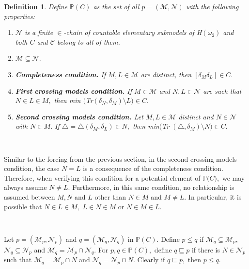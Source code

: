 \documentclass{article}
\newtheorem{definition}[theorem]{Definition}
\begin{document}
\begin{definition}
Define $\mathbb{P}\left(  C\right)  $ as the set of all $p=(\mathcal{M}%
,\mathcal{N})$ with the following properties:

\begin{enumerate}
\item $\mathcal{N}$ is a finite $\in$-chain of countable elementary submodels
of \textsf{H}$\left(  \omega_{2}\right)  $ and both $C$ and $\mathcal{C}$
belong to all of them.

\item $\mathcal{M\subseteq N}.$

\item \textbf{Completeness condition. }If $M,L\in\mathcal{M}$ are distinct,
then $\left[  \delta_{M}\delta_{L}\right]  \in C.$

\item \textbf{First} \textbf{crossing models condition. }If $M\in\mathcal{M}$
and $N,L\in\mathcal{N}$ are such that $N\in L\in M,$ then \textsf{min}%
$($\textsf{Tr}$(\delta_{N},\delta_{M})\setminus L)\in C.$

\item \textbf{Second crossing models condition. }Let $M,L\in\mathcal{M}$
distinct and $N\in\mathcal{N}$ with $N\in M.$ If $\triangle=\triangle\left(
\delta_{M},\delta_{L}\right)  \in N,$ then \textsf{min}$($\textsf{Tr}%
$(\triangle,\delta_{M})\setminus N)\in C.$
\end{enumerate}
\end{definition}

\qquad\ \qquad\ \qquad\ \ 

Similar to the forcing from the previous section, in the second crossing
models condition, the case $N=L$ is a consequence of the completeness
condition. Therefore, when verifying this condition for a potential element of
$\mathbb{P(}C\mathbb{)},$ we may always assume $N\neq L.$ Furthermore, in this
same condition, no relationship is assumed between $M,N$ and $L$ other than
$N\in M$ and $M\neq L.$ In particular, it is possible that $N\in L\in M,$
$L\in N\in M$ or $N\in M\in L.$

\qquad\ \ \ \qquad\ \ \ 

Let $p=(\mathcal{M}_{p},\mathcal{N}_{p})$ and $q=(\mathcal{M}_{q}%
,\mathcal{N}_{q})$ in $\mathbb{P}\left(  C\right)  .$ Define $p\leq q$ if
$\mathcal{M}_{q}\subseteq\mathcal{M}_{p},$ $\mathcal{N}_{q}\subseteq
\mathcal{N}_{p}$ and $\mathcal{M}_{q}=\mathcal{M}_{p}\cap\mathcal{N}_{q}.$ For
$p,q\in\mathbb{P}\left(  C\right)  ,$ define $q\sqsubseteq p$ if there is
$N\in\mathcal{N}_{p}$ such that $\mathcal{M}_{q}=\mathcal{M}_{p}\cap N$ and
$\mathcal{N}_{q}=\mathcal{N}_{p}\cap N.$ Clearly if $q\sqsubseteq p,$ then
$p\leq q.$
\end{document}
